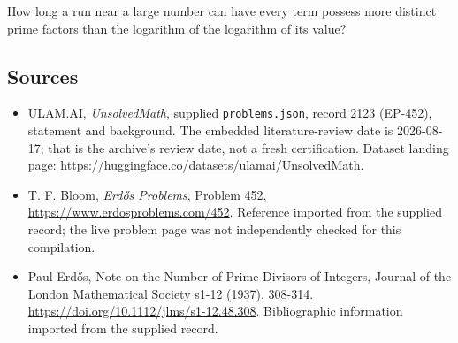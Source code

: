 \documentclass[11pt,a4paper]{article}
\begin{document}
How long a run near a large number can have every term possess more distinct prime factors than the logarithm of the logarithm of its value?

\subsection{Sources}

{\small

\begin{itemize}

\item[\hypertarget{source:2123:1}{S1}] ULAM.AI, \emph{UnsolvedMath}, supplied \texttt{problems.json}, record 2123 (EP-452), statement and background. The embedded literature-review date is 2026-08-17; that is the archive’s review date, not a fresh certification. Dataset landing page: \url{https://huggingface.co/datasets/ulamai/UnsolvedMath}.

\item[\hypertarget{source:2123:2}{S2}] T. F. Bloom, \emph{Erdős Problems}, Problem 452, \url{https://www.erdosproblems.com/452}. Reference imported from the supplied record; the live problem page was not independently checked for this compilation.

\item[\hypertarget{source:2123:3}{S3}] Paul Erdős, Note on the Number of Prime Divisors of Integers, Journal of the London Mathematical Society s1-12 (1937), 308-314. \url{https://doi.org/10.1112/jlms/s1-12.48.308}. Bibliographic information imported from the supplied record.

\end{itemize}

}

\label{end:2123}
\end{document}
